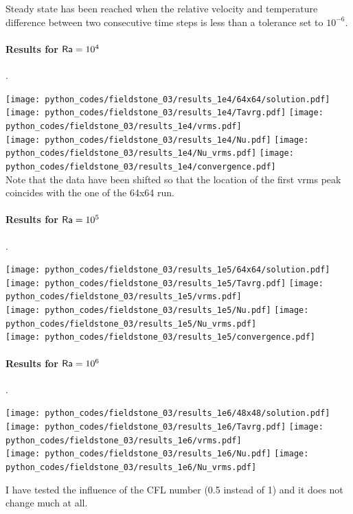 Steady state has been reached when the relative velocity and temperature difference between two consecutive 
time steps is less than a tolerance set to $10^{-6}$. 


\newpage
\paragraph{Results for ${\mathsf{Ra}}=10^4$}.
\begin{center}
\texttt{[image: python\_codes/fieldstone\_03/results\_1e4/64x64/solution.pdf]}\\
\texttt{[image: python\_codes/fieldstone\_03/results\_1e4/Tavrg.pdf]}
\texttt{[image: python\_codes/fieldstone\_03/results\_1e4/vrms.pdf]}\\
\texttt{[image: python\_codes/fieldstone\_03/results\_1e4/Nu.pdf]}
\texttt{[image: python\_codes/fieldstone\_03/results\_1e4/Nu\_vrms.pdf]}
\texttt{[image: python\_codes/fieldstone\_03/results\_1e4/convergence.pdf]}\\
{\captionfont Note that the \aspect data have been shifted so that the location of the 
first vrms peak coincides with the one of the 64x64 run.}
\end{center}

\newpage
\paragraph{Results for ${\mathsf{Ra}}=10^5$}.
\begin{center}
\texttt{[image: python\_codes/fieldstone\_03/results\_1e5/64x64/solution.pdf]}\\
\texttt{[image: python\_codes/fieldstone\_03/results\_1e5/Tavrg.pdf]}
\texttt{[image: python\_codes/fieldstone\_03/results\_1e5/vrms.pdf]}\\
\texttt{[image: python\_codes/fieldstone\_03/results\_1e5/Nu.pdf]}
\texttt{[image: python\_codes/fieldstone\_03/results\_1e5/Nu\_vrms.pdf]}\\
\texttt{[image: python\_codes/fieldstone\_03/results\_1e5/convergence.pdf]}\\
\end{center}

\newpage
\paragraph{Results for ${\mathsf{Ra}}=10^6$}.
\begin{center}
\texttt{[image: python\_codes/fieldstone\_03/results\_1e6/48x48/solution.pdf]}\\
\texttt{[image: python\_codes/fieldstone\_03/results\_1e6/Tavrg.pdf]}
\texttt{[image: python\_codes/fieldstone\_03/results\_1e6/vrms.pdf]}\\
\texttt{[image: python\_codes/fieldstone\_03/results\_1e6/Nu.pdf]}
\texttt{[image: python\_codes/fieldstone\_03/results\_1e6/Nu\_vrms.pdf]}
\end{center}


I have tested the influence of the CFL number (0.5 instead of 1) and it does not change much at all.





